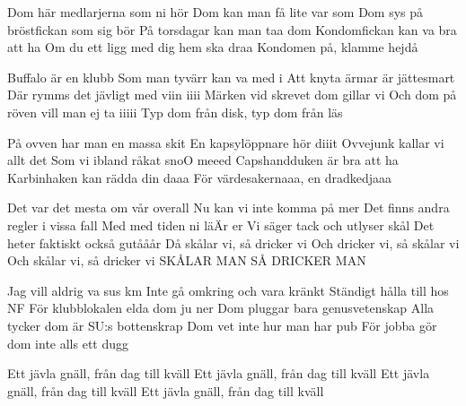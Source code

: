 Dom här medlarjerna som ni hör
Dom kan man få lite var som
Dom sys på bröstfickan som sig bör
På torsdagar kan man taa dom
Kondomfickan kan va bra att ha
Om du ett ligg med dig hem ska draa
Kondomen på, klamme hejdå

Buffalo är en klubb
Som man tyvärr kan va med i
Att knyta ärmar är jättesmart
Där rymms det jävligt med viin iiii
Märken vid skrevet dom gillar vi
Och dom på röven vill man ej ta iiiii
Typ dom från disk, typ dom från läs

På ovven har man en massa skit
En kapsylöppnare hör diiit
Ovvejunk kallar vi allt det
Som vi ibland råkat snoO meeed
Capshandduken är bra att ha
Karbinhaken kan rädda din daaa
För värdesakernaaa, en dradkedjaaa

Det var det mesta om vår overall
Nu kan vi inte komma på mer
Det finns andra regler i vissa fall
Med med tiden ni läÄr er
Vi säger tack och utlyser skål
Det heter faktiskt också gutååår
Då skålar vi, så dricker vi
Och dricker vi, så skålar vi
Och skålar vi, så dricker vi
SKÅLAR MAN SÅ DRICKER MAN




\songtext{}Jag vill aldrig va sus km
Inte gå omkring och vara kränkt
Ständigt hålla till hos NF
För klubblokalen elda dom ju ner
Dom pluggar bara genusvetenskap 
Alla tycker dom är SU:s bottenskrap
Dom vet inte hur man har pub
För jobba gör dom inte alls ett dugg

Ett jävla gnäll, från dag till kväll
Ett jävla gnäll, från dag till kväll
Ett jävla gnäll, från dag till kväll
Ett jävla gnäll, från dag till kväll